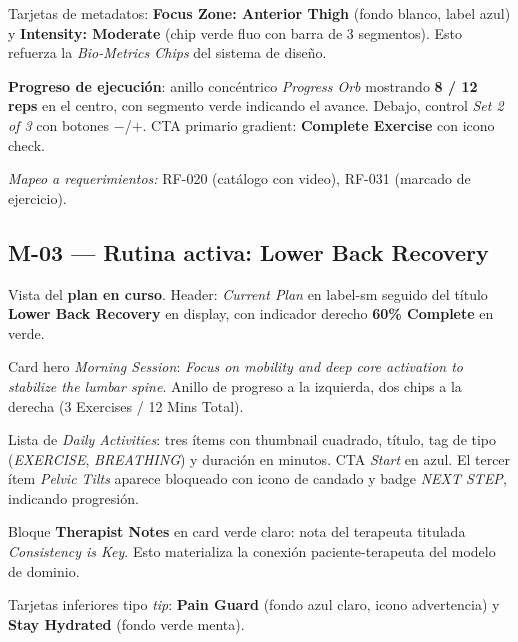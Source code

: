 Tarjetas de metadatos: \textbf{Focus Zone: Anterior Thigh} (fondo blanco, label azul) y \textbf{Intensity: Moderate} (chip verde fluo con barra de 3 segmentos). Esto refuerza la \textit{Bio-Metrics Chips} del sistema de diseño.

\textbf{Progreso de ejecución}: anillo concéntrico \textit{Progress Orb} mostrando \textbf{8 / 12 reps} en el centro, con segmento verde indicando el avance. Debajo, control \textit{Set 2 of 3} con botones $-$/$+$. CTA primario gradient: \textbf{Complete Exercise} con icono check.

\textit{Mapeo a requerimientos:} RF-020 (catálogo con video), RF-031 (marcado de ejercicio).


\subsection{M-03 --- Rutina activa: Lower Back Recovery}

Vista del \textbf{plan en curso}. Header: \textit{Current Plan} en label-sm seguido del título \textbf{Lower Back Recovery} en display, con indicador derecho \textbf{60\% Complete} en verde.

Card hero \textit{Morning Session}: \textit{Focus on mobility and deep core activation to stabilize the lumbar spine}. Anillo de progreso a la izquierda, dos chips a la derecha (3 Exercises / 12 Mins Total).

Lista de \textit{Daily Activities}: tres ítems con thumbnail cuadrado, título, tag de tipo (\textit{EXERCISE}, \textit{BREATHING}) y duración en minutos. CTA \textit{Start} en azul. El tercer ítem \textit{Pelvic Tilts} aparece bloqueado con icono de candado y badge \textit{NEXT STEP}, indicando progresión.

Bloque \textbf{Therapist Notes} en card verde claro: nota del terapeuta titulada \textit{Consistency is Key}. Esto materializa la conexión paciente-terapeuta del modelo de dominio.

Tarjetas inferiores tipo \textit{tip}: \textbf{Pain Guard} (fondo azul claro, icono advertencia) y \textbf{Stay Hydrated} (fondo verde menta).


